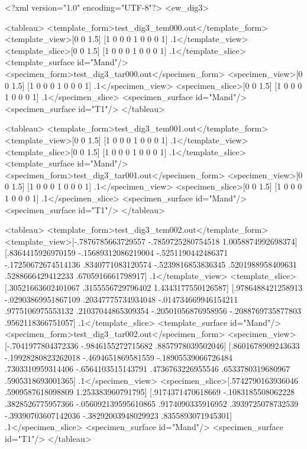 
\begin{DoxyVerbInclude}
<?xml version="1.0" encoding="UTF-8"?>
<ew_dig3>

<tableau>
<template_form>test_dig3_tem000.out</template_form>
<template_view>[0 0 1.5] [1 0 0 0 1 0 0 0 1] .1</template_view>
<template_slice>[0 0 1.5] [1 0 0 0 1 0 0 0 1] .1</template_slice>
<template_surface id="Mand"/>
<specimen_form>test_dig3_tar000.out</specimen_form>
<specimen_view>[0 0 1.5] [1 0 0 0 1 0 0 0 1] .1</specimen_view>
<specimen_slice>[0 0 1.5] [1 0 0 0 1 0 0 0 1] .1</specimen_slice>
<specimen_surface id="Mand"/>
<specimen_surface id="T1"/>
</tableau>

<tableau>
<template_form>test_dig3_tem001.out</template_form>
<template_view>[0 0 1.5] [1 0 0 0 1 0 0 0 1] .1</template_view>
<template_slice>[0 0 1.5] [1 0 0 0 1 0 0 0 1] .1</template_slice>
<template_surface id="Mand"/>
<specimen_form>test_dig3_tar001.out</specimen_form>
<specimen_view>[0 0 1.5] [1 0 0 0 1 0 0 0 1] .1</specimen_view>
<specimen_slice>[0 0 1.5] [1 0 0 0 1 0 0 0 1] .1</specimen_slice>
<specimen_surface id="Mand"/>
<specimen_surface id="T1"/>
</tableau>

<tableau>
<template_form>test_dig3_tem002.out</template_form>
<template_view>[-.7876785663729557 -.7859725280754518 1.0058874992698374] [.8364415926970159 -.15689312086219004 -.5251190442486371 -.17250672674514136 .8340771083120574 -.5239816853836345 .5201988958409631 .5288666429412233 .6705916661798917] .1</template_view>
<template_slice>[.30521663602401067 .3155556729796402 1.4343177550126587] [.9786488421258913 -.02903869951867109 .20347775734934048 -.014734669946154211 .9775106975553132 .21037044865309354 -.20501056876958956 -.2088769735877803 .9562118366751057] .1</template_slice>
<template_surface id="Mand"/>
<specimen_form>test_dig3_tar002.out</specimen_form>
<specimen_view>[-.7041977804372336 -.9846155272715682 .8857978039502046] [.8601678909243633 -.19928280823262018 -.4694651869581559 -.18905539066726484 .7303310959314406 -.6564103515143791 .4736763226955546 .6533780319680967 .5905318693001365] .1</specimen_view>
<specimen_slice>[.5742790163936046 .5909587618098809 1.253383960791795] [.9174371470618669 -.1083185508062228 .3828526775957366 -.056092139595610865 .9174090335916952 .3939725078732539 -.39390703607142036 -.38292003948029923 .8355893071945301] .1</specimen_slice>
<specimen_surface id="Mand"/>
<specimen_surface id="T1"/>
</tableau>


\end{DoxyVerbInclude}
